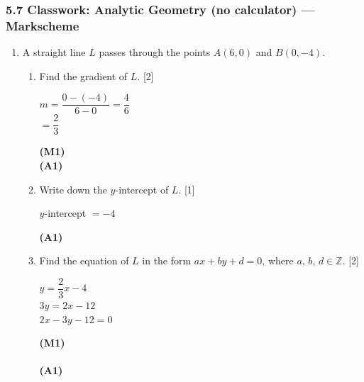 \documentclass[12pt, twoside]{article}
\begin{document}
\subsubsection*{5.7 Classwork: Analytic Geometry (no calculator) --- Markscheme}

\begin{enumerate}[itemsep=0.2cm]

\item A straight line $L$ passes through the points $A(6, 0)$ and $B(0, -4)$.

\begin{enumerate}[itemsep=0.3cm]
  \item Find the gradient of $L$. \hfill [2]

  \begin{minipage}[t]{0.62\textwidth}
  $m = \dfrac{0 - (-4)}{6 - 0} = \dfrac{4}{6}$\\[0.15cm]
  $= \dfrac{2}{3}$
  \end{minipage}%
  \begin{minipage}[t]{0.35\textwidth}\raggedleft
  \textbf{(M1)}\\[0.15cm]
  \textbf{(A1)}
  \end{minipage}

  \medskip
  \item Write down the $y$-intercept of $L$. \hfill [1]

  \begin{minipage}[t]{0.62\textwidth}
  $y$-intercept $= -4$
  \end{minipage}%
  \begin{minipage}[t]{0.35\textwidth}\raggedleft
  \textbf{(A1)}
  \end{minipage}

  \medskip
  \item Find the equation of $L$ in the form $ax + by + d = 0$,
        where $a$, $b$, $d \in \mathbb{Z}$. \hfill [2]

  \begin{minipage}[t]{0.62\textwidth}
  $y = \dfrac{2}{3}x - 4$\\[0.15cm]
  $3y = 2x - 12$\\[0.15cm]
  $2x - 3y - 12 = 0$
  \end{minipage}%
  \begin{minipage}[t]{0.35\textwidth}\raggedleft
  \textbf{(M1)}\\[0.15cm]
  ~\\[0.15cm]
  \textbf{(A1)}
  \end{minipage}


\end{enumerate}
\end{enumerate}
\end{document}
